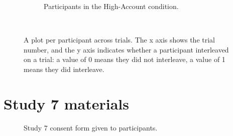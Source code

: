 \begin{figure}[!htbp]
\begin{subfigure}[b]{0.5\textwidth}
        \caption{Participants in the High-Account condition.}
    \end{subfigure}
    ~ %
    \caption{A plot per participant across trials. The x axis shows the trial number, and the y axis indicates whether a participant interleaved on a trial: a value of 0 means they did not interleave, a value of 1 means they did interleave.}\label{fig:ch34_4-plotpp}
\end{figure}


\chapter{Study 7 materials}
\begin{figure}[htp] 
\caption{Study 7 consent form given to participants.}
\label{fig:ch67-Study7Consentform}
\end{figure} 


